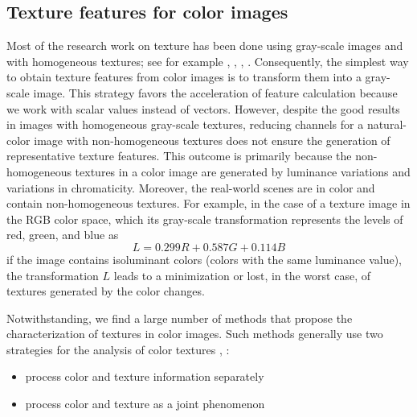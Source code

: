 \subsection{Texture features for color images}
Most of the research work on texture has been done using gray-scale images and with homogeneous textures; see for example \citep{Jain.Farrokhnia:IJPR:1991}, \citep{ChengjunLiu.Wechsler:NN:2003}, \citep{Liu.Koga.ea:ICDAR:2005}, \citep{Al-Kadi:arXiv:2017}. Consequently, the simplest way to obtain texture features from color images is to transform them into a gray-scale image. This strategy favors the acceleration of feature calculation because we work with scalar values instead of vectors. However, despite the good results in images with homogeneous gray-scale textures, reducing channels for a natural-color image with non-homogeneous textures does not ensure the generation of representative texture features. This outcome is primarily because the non-homogeneous textures in a color image are generated by luminance variations and variations in chromaticity. Moreover, the real-world scenes are in color and contain non-homogeneous textures.  For example, in the case of a texture image in the RGB color space, which its gray-scale transformation represents the levels of red, green, and blue \citep{Artusi.Banterle.ea:Book:2016} as
\begin{equation}\label{eq:color2gray_formula}
    L = 0.299 R + 0.587 G + 0.114 B    
\end{equation} 
if the image contains isoluminant colors (colors with the same luminance value), the transformation $L$ leads to a minimization or lost, in the worst case, of textures generated by the color changes.


Notwithstanding, we find a large number of methods that propose the characterization of textures in color images. Such methods generally use two strategies for the analysis of color textures \citep{Maenpaa.Pietikainen:PR:2004}, \citep{Qazi.Alata.ea:PR:2011}:

\begin{itemize}
	\item process color and texture information separately
	\item process color and texture as a joint phenomenon
\end{itemize} 

